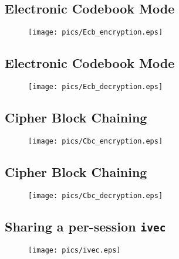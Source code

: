 \documentclass[xga]{xdvislides}
\begin{document}
\subsection{Electronic Codebook Mode}
\begin{figure}[hb]
    \begin{center}
        \texttt{[image: pics/Ecb\_encryption.eps]} \\
    \end{center}
\end{figure}

\subsection{Electronic Codebook Mode}
\begin{figure}[hb]
    \begin{center}
        \texttt{[image: pics/Ecb\_decryption.eps]} \\
    \end{center}
\end{figure}

\subsection{Cipher Block Chaining}
\begin{figure}[hb]
    \begin{center}
        \texttt{[image: pics/Cbc\_encryption.eps]} \\
    \end{center}
\end{figure}

\subsection{Cipher Block Chaining}
\begin{figure}[hb]
    \begin{center}
        \texttt{[image: pics/Cbc\_decryption.eps]} \\
    \end{center}
\end{figure}

\subsection{Sharing a per-session {\tt ivec}}
\begin{figure}[hb]
    \begin{center}
        \texttt{[image: pics/ivec.eps]} \\
    \end{center}
\end{figure}
\end{document}
